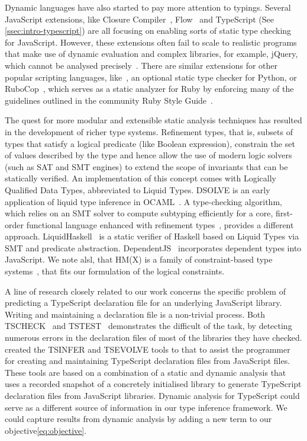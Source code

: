 \documentclass[acmsmall, review, anonymous]{acmart}\settopmatter{printfolios=true,printccs=false,printacmref=false}
\begin{document}
Dynamic languages have also started to pay more attention to typings. Several
JavaScript extensions, like Closure Compiler~\citep{closure}, Flow~\cite{flow} and
TypeScript (See \cref{ssec:intro-typescript}) are all focusing on enabling
sorts of static type checking for JavaScript.
%
%
However, these
extensions often fail to scale to realistic programs that make use of dynamic
evaluation and complex libraries, for example, jQuery, which cannot be analysed
precisely~\cite{jensen09}.
%
There are similar extensions for other popular scripting languages,
like~\citep{mypy}, an optional static type checker for Python,
or RuboCop~\citep{rubycop}, which serves as a static analyzer for Ruby by enforcing many of the guidelines
outlined in the community Ruby Style Guide~\citep{rubystyle}.

The quest for more modular and extensible static analysis techniques has
resulted in the development of richer type systems.
Refinement types, that is, subsets of types that satisfy a logical predicate (like Boolean expression),
constrain the set of values described by the type and hence allow the use of
modern logic solvers (such as SAT and SMT engines) to extend the
scope of invariants that can be statically verified.
An implementation of this concept comes with Logically Qualified Data Types,
abbreviated to Liquid Types.
DSOLVE is an early application of liquid type inference in OCAML~\citep{liquid}.
A type-checking algorithm, which relies on an SMT solver
to compute subtyping efficiently for a core, first-order functional language
enhanced with refinement types~\citep{semanticSMT}, provides a different
approach.
LiquidHaskell~\citep{refHaskell} is a static verifier of
Haskell based on Liquid Types via SMT and predicate
abstraction.
DependentJS~\citep{dependentJS} incorporates dependent types into JavaScript. We note alsl, that HM(X) is a family of constraint-based type
systems~\citep{odersky99,pottier05}, that fits our formulation of the logical constraints.

A line of research closely related to our work concerns
the specific problem of predicting a TypeScript declaration file for an underlying JavaScript library. Writing and maintaining a declaration file is a non-trivial process. Both TSCHECK~\cite{feldthaus14} and TSTEST~\cite{kristensen17} demonstrates the difficult of the task, by detecting numerous errors in the declaration files of most of the libraries they have checked. \cite{tstools17} created the TSINFER and TSEVOLVE tools to that to assist the 
programmer for creating and maintaining TypeScript declaration files from JavaScript files. These tools are based on a combination of a static and dynamic analysis that uses a recorded snapshot of a concretely initialised library to generate TypeScript declaration files from JavaScript libraries. Dynamic analysis for TypeScript could serve as a different
source of information in our type inference framework. We
could capture results from dynamic analysis by adding a new term to our objective\eqref{eq:objective}.
\end{document}
